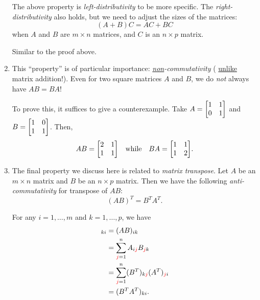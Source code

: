 \begin{enumerate}
The above property is \emph{left-distributivity} to be more specific. The
\emph{right-distributivity} also holds, but we need to adjust the sizes of the
matrices:
\[
(A+B)C=AC+BC
\]
when \(A\) and \(B\) are \(m\times n\) matrices, and \(C\) is an \(n\times p\)
matrix.

\begin{pf}
Similar to the proof above.
\end{pf}

\item \label{it:matrix-mult-noncomm}
This ``property'' is of particular importance: \emph{\underline{non}-commutativity} (\warn{}
\underline{unlike} matrix addition!). Even for two square matrices \(A\) and
\(B\), we do \emph{not} always have \(AB=BA\)!

\begin{pf}
To prove this, it suffices to give a counterexample. Take \(A=\mqty[1&1\\
0&1]\) and \(B=\mqty[1&0\\ 1&1]\). Then,
\[
AB=\mqty[2&1\\ 1&1]\qqtext{while}
BA=\mqty[1&1\\ 1&2].
\]
\end{pf}

\item \label{it:matrix-prod-transpose-anticomm}
The final property we discuss here is related to \emph{matrix transpose}.  Let
\(A\) be an \(m\times n\) matrix and \(B\) be an \(n\times p\) matrix. Then we
have the following \emph{anti-commutativity} for transpose of \(AB\):
\[
(AB)^{T}=B^{T}A^{T}.
\]
\begin{pf}
For any \(i=1,\dotsc,m\) and \(k=1,\dotsc,p\), we have
\begin{align*}
[(AB)^{T}]_{ki}&=(AB)_{ik}\\
&=\sum_{\rc{j}=1}^{n}A_{i\rc{j}}B_{\rc{j}k}\\
&=\sum_{\rc{j}=1}^{n}(B^T)_{k\rc{j}}(A^T)_{\rc{j}i}\\
&=(B^{T}A^{T})_{ki}.
\end{align*}
\end{pf}
\end{enumerate}
